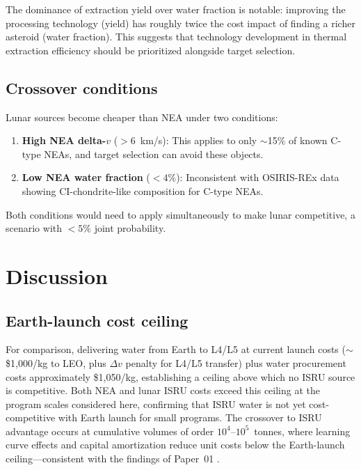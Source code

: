 \documentclass[preprint,12pt]{elsarticle}
\begin{document}
The dominance of extraction yield over water fraction is notable: improving the processing technology (yield) has roughly twice the cost impact of finding a richer asteroid (water fraction). This suggests that technology development in thermal extraction efficiency should be prioritized alongside target selection.

\subsection{Crossover conditions}

Lunar sources become cheaper than NEA under two conditions:
\begin{enumerate}
    \item \textbf{High NEA delta-$v$} ($> 6$~km/s): This applies to only $\sim$15\% of known C-type NEAs, and target selection can avoid these objects.
    \item \textbf{Low NEA water fraction} ($< 4\%$): Inconsistent with OSIRIS-REx data showing CI-chondrite-like composition for C-type NEAs.
\end{enumerate}

Both conditions would need to apply simultaneously to make lunar competitive, a scenario with $<5\%$ joint probability.

\section{Discussion}
\label{sec:discussion}

\subsection{Earth-launch cost ceiling}

For comparison, delivering water from Earth to L4/L5 at current launch costs ($\sim$\$1{,}000/kg to LEO, plus $\Delta v$ penalty for L4/L5 transfer) plus water procurement costs approximately \$1{,}050/kg, establishing a ceiling above which no ISRU source is competitive. Both NEA and lunar ISRU costs exceed this ceiling at the program scales considered here, confirming that ISRU water is not yet cost-competitive with Earth launch for small programs. The crossover to ISRU advantage occurs at cumulative volumes of order $10^4$--$10^5$~tonnes, where learning curve effects and capital amortization reduce unit costs below the Earth-launch ceiling---consistent with the findings of Paper~01 \cite{hakkenberg2026isru}.
\end{document}
